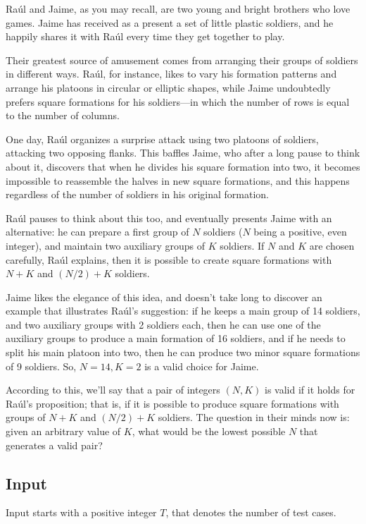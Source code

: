 Raúl and Jaime, as you may recall, are two young and bright brothers who
love games. Jaime has received as a present a set of little plastic
soldiers, and he happily shares it with Raúl every time they get
together to play.

Their greatest source of amusement comes from arranging their groups of
soldiers in different ways. Raúl, for instance, likes to vary his
formation patterns and arrange his platoons in circular or elliptic
shapes, while Jaime undoubtedly prefers square formations for his
soldiers---in which the number of rows is equal to the number of
columns.

One day, Raúl organizes a surprise attack using two platoons of
soldiers, attacking two opposing flanks. This baffles Jaime, who after a
long pause to think about it, discovers that when he divides his square
formation into two, it becomes impossible to reassemble the halves in
new square formations, and this happens regardless of the number of
soldiers in his original formation.

Raúl pauses to think about this too, and eventually presents Jaime with
an alternative: he can prepare a first group of $N$ soldiers ($N$ being
a positive, even integer), and maintain two auxiliary groups of $K$
soldiers. If $N$ and $K$ are chosen carefully, Raúl explains, then it is
possible to create square formations with $N+K$ and $(N/2)+K$ soldiers.

Jaime likes the elegance of this idea, and doesn't take long to discover
an example that illustrates Raúl's suggestion: if he keeps a main group
of 14 soldiers, and two auxiliary groups with 2 soldiers each, then he
can use one of the auxiliary groups to produce a main formation of 16
soldiers, and if he needs to split his main platoon into two, then he
can produce two minor square formations of 9 soldiers. So, $N=14, K=2$
is a valid choice for Jaime.

According to this, we'll say that a pair of integers $(N, K)$ is valid
if it holds for Raúl's proposition; that is, if it is possible to
produce square formations with groups of $N+K$ and $(N/2)+K$ soldiers.
The question in their minds now is: given an arbitrary value of $K$,
what would be the lowest possible $N$ that generates a valid pair?

\subsection{Input}\label{input}

Input starts with a positive integer $T$, that denotes the number of
test cases.

